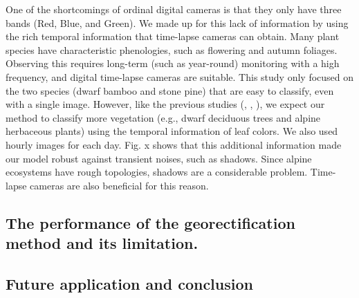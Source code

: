 \documentclass{article}
\begin{document}
One of the shortcomings of ordinal digital cameras is that they only have three bands (Red, Blue, and Green). We made up for this lack of information by using the rich temporal information that time-lapse cameras can obtain. Many plant species have characteristic phenologies, such as flowering and autumn foliages. Observing this requires long-term (such as year-round) monitoring with a high frequency, and digital time-lapse cameras are suitable. This study only focused on the two species (dwarf bamboo and stone pine) that are easy to classify, even with a single image. However, like the previous studies (\cite{Tigges2013RemSenEnv}, \cite{Son2013RemSen}, \cite{Heupel2018PFG}), we expect our method to classify more vegetation (e.g., dwarf deciduous trees and alpine herbaceous plants) using the temporal information of leaf colors. We also used hourly images for each day. Fig. x shows that this additional information made our model robust against transient noises, such as shadows. Since alpine ecosystems have rough topologies, shadows are a considerable problem. Time-lapse cameras are also beneficial for this reason.

\hypertarget{the-performance-of-the-georectification-method-and-its-limitation.}{%
\subsection{The performance of the georectification method and its limitation.}\label{the-performance-of-the-georectification-method-and-its-limitation.}}

\hypertarget{future-application-and-conclusion}{%
\subsection{Future application and conclusion}\label{future-application-and-conclusion}}



\end{document}
